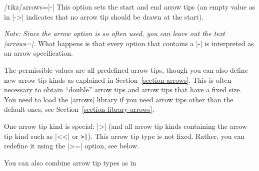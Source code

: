 \begin{key}{/tikz/arrows=|-|}
  This option sets the start and end arrow tips (an empty value as in |->|
  indicates that no arrow tip should be drawn at the start).%

  \emph{Note: Since the arrow option is so often used, you can leave
    out the text |arrows=|.} What happens is that every option that
  contains a |-| is interpreted as an arrow specification.

\begin{codeexample}[]
\end{codeexample}

  The permissible values are all predefined arrow tips, though
  you can also define new arrow tip kinds as explained in
  Section~\ref{section-arrows}. This is often necessary to obtain
  ``double'' arrow tips and arrow tips that have a fixed size. You
  need to load the |arrows| library if you need arrow tips other than
  the default ones, see Section~\ref{section-library-arrows}.

  One arrow tip kind is special: |>| (and all arrow tip kinds containing the
  arrow tip kind such as |<<| or \verb!>|!). This arrow tip type is not  
  fixed. Rather, you can redefine it using the |>=| option, see
  below. 

  \example You can also combine arrow tip types as in
\begin{codeexample}[]
\begin{tikzpicture}[thick]
  \draw[to reversed-to]   (0,0) .. controls +(.5,0) and +(-.5,-.5) .. +(1.5,1);
  \draw[[-latex reversed] (1,0) .. controls +(.5,0) and +(-.5,-.5) .. +(1.5,1);
  \draw[latex-)]          (2,0) .. controls +(.5,0) and +(-.5,-.5) .. +(1.5,1);
  \useasboundingbox (-.1,-.1) rectangle (3.1,1.1); %
\end{tikzpicture}
\end{codeexample}
\end{key}

